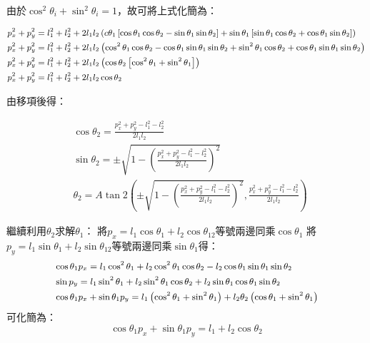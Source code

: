 \documentclass[class=NCU_thesis, crop=false]{standalone}
\begin{document}
由於$\cos^2 \theta_{i}+\sin^2 \theta_{i}=1$，故可將上式化簡為：

$$
\begin{small}
\begin{aligned}
& p_{x}^2+p_{y}^2=l_1^2+l_2^2+2l_1 l_2\left(c \theta_1\left[\cos \theta_1 \cos \theta_2-\sin \theta_1 \sin \theta_2\right]+\sin \theta_1\left[\sin \theta_1 \cos \theta_2+\cos \theta_1 \sin \theta_2\right]\right) \\
& p_{x}^2+p_y^2=l_1^2+l_2^2+2l_1 l_2\left(\cos^2 \theta_1 \cos \theta_2-\cos \theta_1 \sin \theta_1 \sin \theta_2+\sin^2 \theta_1 \cos \theta_2+\cos \theta_1 \sin \theta_1 \sin \theta_2\right) \\
& p_{x}^2+p_y^2=l_1^2+l_2^2+2l_1 l_2\left(\cos \theta_2\left[\cos^2 \theta_1+\sin^2 \theta_1\right]\right) \\
& p_{x}^2+p_{y}^2=l_1^2+l_2^2+2l_1 l_2 \cos \theta_2
\end{aligned}
\end{small}
$$

由移項後得：

$$
\begin{aligned}
& \cos \theta_2=\frac{p_{x}^2+p_{y}^2-l_1^2-l_2^2}{2l_1 l_2} \\
& \sin \theta_2= \pm \sqrt{1-\left(\frac{p_{x}^2+p_{y}^2-l_1^2-l_2^2}{2l_1 l_2}\right)^2} \\
& \theta_2=A \tan 2\left( \pm \sqrt{1-\left(\frac{p_{x}^2+p_{y}^2-l_1^2-l_2^2}{2l_1 l_2}\right)^2}, \frac{p_{x}^2+p_{y}^2-l_1^2-l_2^2}{2l_1 l_2}\right)
\end{aligned}
$$

繼續利用$\theta_2$求解$\theta_1$：
將$p_{x}=l_1 \cos \theta_1+l_2 \cos \theta_{12}$等號兩邊同乘$\cos \theta_1$
將$p_{y}=l_1 \sin \theta_1+l_2 \sin \theta_{12}$等號兩邊同乘$\sin \theta_1$得：
$$
\begin{small}
\begin{aligned}
& \cos \theta_1 p_{x}=l_1 \cos^2 \theta_1+l_2 \cos^2 \theta_1 \cos \theta_2-l_2 \cos \theta_1 \sin \theta_1 \sin \theta_2 \\
& \sin p_{y}=l_1 \sin^2 \theta_1+l_2 \sin^2 \theta_{1} \cos \theta_2+l_2 \sin \theta_1 \cos \theta_1 \sin \theta_2 \\
& \cos \theta_1 p_{x}+\sin \theta_1 p_{y}=l_1\left(\cos^2 \theta_1+\sin^2 \theta_1\right)+l_2 \theta_2\left(\cos \theta_1+\sin^2 \theta_1\right)
\end{aligned}
\end{small}
$$
可化簡為：
$$
\cos \theta_1 p_{x}+\sin \theta_1 p_{y}=l_1+l_2 \cos \theta_2
$$
\end{document}
